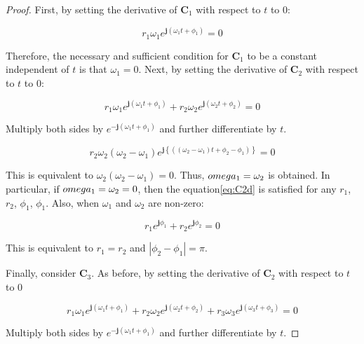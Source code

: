 \documentclass[graybox, envcountchap]{svmult}
\begin{document}
\begin{proof}

First, by setting the derivative of $\bm{C}_1$ with respect to $t$ to 0:

\begin{equation*}
  r_1 \omega_1 e^{ \bm{j} (\omega_1 t + \phi_1)}=0
\end{equation*}

Therefore, the necessary and sufficient condition for $\bm{C}_1$ to be a
constant independent of $t$ is that $\omega_1=0$.  Next, by setting the
derivative of $\bm{C}_2$ with respect to $t$ to 0:

\begin{equation}\label{eq:C2d}
  r_1 \omega_1 e^{ \bm{j} (\omega_1 t + \phi_1)}
  + r_2 \omega_2 e^{ \bm{j} (\omega_2 t + \phi_2)}=0
\end{equation}

Multiply both sides by $e^{ -\bm{j} (\omega_1 t + \phi_1)}$ and further
differentiate by $t$.

\begin{equation*}
  r_2 \omega_2 (\omega_2-\omega_1)
  e^{ \bm{j} \left\{( 
  (\omega_2-\omega_1) t + \phi_2 - \phi_1)
  \right\}
  }=0
\end{equation*}

This is equivalent to $\omega_2 (\omega_2-\omega_1)=0$. Thus, $\\omega_1
=\omega_2$ is obtained. In particular, if $\\omega_1=\omega_2=0$, then the
equation\ref{eq:C2d} is satisfied for any $r_1$, $r_2$, $\phi_1$, $\phi_1$.
Also, when $\omega_1$ and $\omega_2$ are non-zero:

\begin{equation*}
  r_1 e^{ \bm{j} \phi_1} + r_2 e^{ \bm{j} \phi_2} =0
\end{equation*}

This is equivalent to $r_1=r_2$ and $|\phi_2-\phi_1| = \pi$.

Finally, consider $\bm{C}_3$. As before, by setting the derivative of
$\bm{C}_2$ with respect to $t$ to 0

\begin{equation}\label{eq:C3d}
  r_1 \omega_1 e^{ \bm{j} (\omega_1 t + \phi_1)}
  + r_2 \omega_2 e^{ \bm{j} (\omega_2 t + \phi_2)}
  + r_3 \omega_3 e^{ \bm{j} (\omega_3 t + \phi_3)}=0
\end{equation}

Multiply both sides by $e^{ -\bm{j} (\omega_1 t + \phi_1)}$ and further
differentiate by $t$.


\end{proof}
\end{document}
